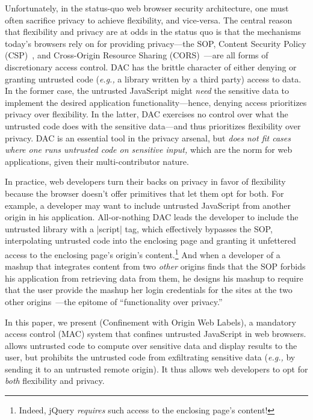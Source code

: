 Unfortunately, in the status-quo web browser security architecture,
one must often sacrifice privacy to achieve flexibility, and
vice-versa. The central reason that flexibility and privacy are at
odds in the status quo is that the mechanisms today's browsers rely on
for providing privacy---the SOP, Content Security Policy
(CSP)~\cite{csp}, and Cross-Origin Resource Sharing
(CORS)~\cite{cors13}---are all forms of discretionary access control.
DAC has the brittle character of either denying or granting
untrusted code (\emph{e.g.,} a library written by a third party) access to
data. In the former case, the untrusted JavaScript might {\em need}
the sensitive data to implement the desired application
functionality---hence, denying access prioritizes privacy over
flexibility. In the latter, DAC exercises no control over what the
untrusted code does with the sensitive data---and thus prioritizes
flexibility over privacy. DAC is an essential tool in the privacy
arsenal, but {\em does not fit cases where one runs untrusted code on
  sensitive input,} which are the norm for web applications, given
their multi-contributor nature.

In practice, web developers turn their backs on privacy in favor of
flexibility because the browser doesn't offer primitives that let them
opt for both. For example, a developer may want to include untrusted
JavaScript from another origin in his application. All-or-nothing DAC
leads the developer to include the untrusted library with a
\js|script| tag, which effectively bypasses the SOP, interpolating
untrusted code into the enclosing page and granting it unfettered
access to the enclosing page's origin's content.\footnote{Indeed,
  jQuery \emph{requires} such access to the enclosing page's content!}
And when a developer of a mashup that integrates content from two {\em
  other} origins finds that the SOP forbids his application from
retrieving data from them, he designs his mashup to require that the
user provide the mashup her login credentials for the sites at the two
other origins~\cite{mint.com}---the epitome of ``functionality over
privacy.''

In this paper, we present \sys{} (Confinement with Origin Web Labels),
a mandatory access control (MAC) system that confines untrusted
JavaScript in web browsers. \sys{} allows untrusted code to compute
over sensitive data and display results to the user, but prohibits the
untrusted code from exfiltrating sensitive data (\emph{e.g.,} by sending it
to an untrusted remote origin). It thus allows web developers to opt
for {\em both} flexibility and privacy.

